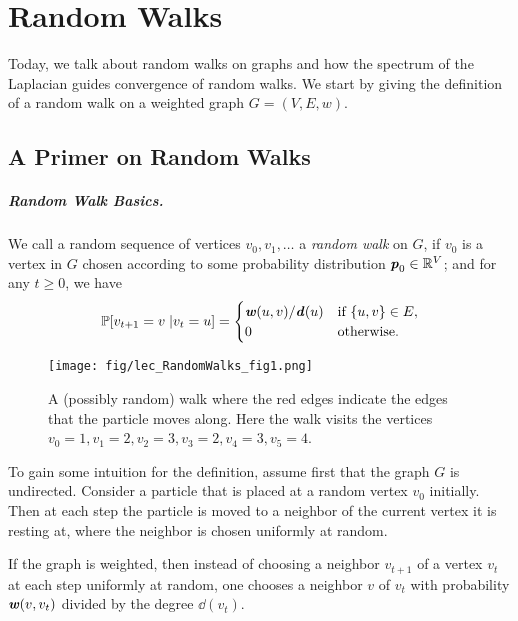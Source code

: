 \newcommand\WWtil{{\tilde{\mathbf{W}}}}
\newcommand\hh{{\boldsymbol{\mathit{h}}}}

\chapter{Random Walks}

\sloppy

Today, we talk about random walks on graphs and how the spectrum of the Laplacian guides convergence of random walks. We start by giving the definition of a random walk on a weighted graph $G=(V,E,w)$.

\section{A Primer on Random Walks}

\paragraph{Random Walk Basics.} We call a random sequence of vertices $v_0, v_1, \dots$ a \emph{random walk} on $G$, if $v_0$ is a vertex in $G$ chosen according to some probability distribution $\boldsymbol{\mathit{p}}_0 \in \mathbb{R}^V$; and for any $t \geq 0$, we have 
\[
\mathbb{P}[v_{t+1} = v \; | v_t = u] = \begin{cases}
    \boldsymbol{\mathit{w}}(u,v)/\boldsymbol{\mathit{d}}(u) & \text{if } \{u,v\} \in E,\\
    0 & \text{otherwise}.
\end{cases}
\]

\begin{figure}[!ht]
    \centering\label{fig:randomWalkSimple}
    \texttt{[image: fig/lec\_RandomWalks\_fig1.png]}
    \caption{A (possibly random) walk where the red edges indicate the edges that the particle moves along. Here the walk visits the vertices $v_0 = 1, v_1 = 2, v_2 = 3, v_3 = 2, v_4 = 3, v_5 = 4$.}
\end{figure}

To gain some intuition for the definition,  assume first that the graph $G$ is undirected. Consider a {\color{red}particle} that is placed at a random vertex $v_0$ initially. Then at each step the particle is moved to a neighbor of the current vertex it is resting at, where the neighbor is chosen uniformly at random. 

If the graph is weighted, then instead of choosing a neighbor $v_{t+1}$ of a vertex $v_t$ at each step uniformly at random, one chooses a neighbor $v$ of $v_t$ with probability $\boldsymbol{\mathit{w}}(v,v_t)$ divided by the degree $\dd(v_t)$.

